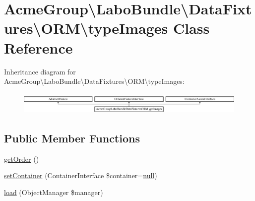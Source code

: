 \hypertarget{class_acme_group_1_1_labo_bundle_1_1_data_fixtures_1_1_o_r_m_1_1type_images}{\section{Acme\+Group\textbackslash{}Labo\+Bundle\textbackslash{}Data\+Fixtures\textbackslash{}O\+R\+M\textbackslash{}type\+Images Class Reference}
\label{class_acme_group_1_1_labo_bundle_1_1_data_fixtures_1_1_o_r_m_1_1type_images}
}
Inheritance diagram for Acme\+Group\textbackslash{}Labo\+Bundle\textbackslash{}Data\+Fixtures\textbackslash{}O\+R\+M\textbackslash{}type\+Images\+:\begin{figure}[H]
\begin{center}
\leavevmode
\includegraphics[height=1.121121cm]{class_acme_group_1_1_labo_bundle_1_1_data_fixtures_1_1_o_r_m_1_1type_images}
\end{center}
\end{figure}
\subsection*{Public Member Functions}
\begin{DoxyCompactItemize}
\item 
\hyperlink{class_acme_group_1_1_labo_bundle_1_1_data_fixtures_1_1_o_r_m_1_1type_images_ad094f84478ee1125696ab90eef59a5b4}{get\+Order} ()
\item 
\hyperlink{class_acme_group_1_1_labo_bundle_1_1_data_fixtures_1_1_o_r_m_1_1type_images_ae505570854fde41e19884f56adff57c8}{set\+Container} (Container\+Interface \$container=\hyperlink{validate_8js_afb8e110345c45e74478894341ab6b28e}{null})
\item 
\hyperlink{class_acme_group_1_1_labo_bundle_1_1_data_fixtures_1_1_o_r_m_1_1type_images_a5de6abf8aa97a16352f6691ffcee96d4}{load} (Object\+Manager \$manager)
\end{DoxyCompactItemize}


